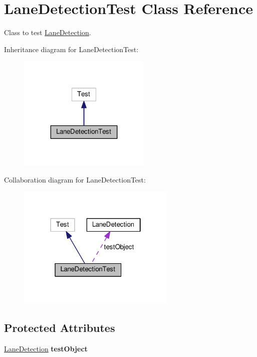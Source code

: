 \hypertarget{classLaneDetectionTest}{}\section{Lane\+Detection\+Test Class Reference}
\label{classLaneDetectionTest}


Class to test \hyperlink{classLaneDetection}{Lane\+Detection}.  




Inheritance diagram for Lane\+Detection\+Test\+:
\nopagebreak
\begin{figure}[H]
\begin{center}
\leavevmode
\includegraphics[width=179pt]{classLaneDetectionTest__inherit__graph}
\end{center}
\end{figure}


Collaboration diagram for Lane\+Detection\+Test\+:
\nopagebreak
\begin{figure}[H]
\begin{center}
\leavevmode
\includegraphics[width=214pt]{classLaneDetectionTest__coll__graph}
\end{center}
\end{figure}
\subsection*{Protected Attributes}
\begin{DoxyCompactItemize}
\item 
\hyperlink{classLaneDetection}{Lane\+Detection} {\bfseries test\+Object}\hypertarget{classLaneDetectionTest_a6b2e5e966d2d3b19b8389608a08657af}{}\label{classLaneDetectionTest_a6b2e5e966d2d3b19b8389608a08657af}

\end{DoxyCompactItemize}


